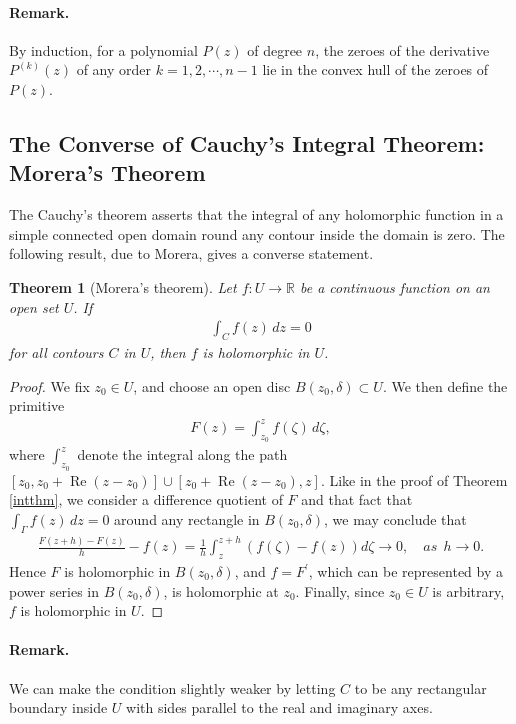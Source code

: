 \documentclass{article}
\numberwithin{equation}{section}
\newcommand{\bbR}{\mathbb{R}}
\DeclareMathOperator{\re}{Re}
\theoremstyle{plain}
\newtheorem{theorem}{Theorem}[section]
\theoremstyle{definition}
\begin{document}
\paragraph{Remark.} By induction, for a polynomial $P(z)$ of degree $n$, the zeroes of the derivative $P^{(k)}(z)$ of any order $k=1,2,\cdots,n-1$ lie in the convex hull of the zeroes of $P(z)$.

\subsection{The Converse of Cauchy's Integral Theorem: Morera's Theorem}
The Cauchy's theorem asserts that the integral of any holomorphic function in a simple connected open domain round any contour inside the domain is zero. The following result, due to Morera, gives a converse statement.
\begin{theorem}[Morera's theorem]\label{morera}
Let $f:U\to\bbR$ be a continuous function on an open set $U$. If
\begin{align*}
	\int_C f(z)\,dz=0
\end{align*}
for all contours $C$ in $U$, then $f$ is holomorphic in $U$.
\end{theorem}
\begin{proof}
We fix $z_0\in U$, and choose an open disc $B(z_0,\delta)\subset U$. We then define the primitive
\begin{align*}
	F(z)=\int_{z_0}^z f(\zeta)\,d\zeta,
\end{align*}
where $\int_{z_0}^z$ denote the integral along the path $[z_0,z_0+\re(z-z_0)]\cup[z_0+\re(z-z_0),z]$. Like in the proof of Theorem \ref{intthm}, we consider a difference quotient of $F$ and that fact that $\int_\Gamma f(z)\,dz=0$ around any rectangle in $B(z_0,\delta)$, we may conclude that
\begin{align*}
	\frac{F(z+h)-F(z)}{h}-f(z)=\frac{1}{h}\int_{z}^{z+h}(f(\zeta)-f(z))d\zeta\to 0,\quad as\ \ h\to 0.
\end{align*}
Hence $F$ is holomorphic in $B(z_0,\delta)$, and $f=F^\prime$, which can be represented by a power series in $B(z_0,\delta)$, is holomorphic at $z_0$. Finally, since $z_0\in U$ is arbitrary, $f$ is holomorphic in $U$.
\end{proof}
\paragraph{Remark.} We can make the condition slightly weaker by letting $C$ to be any rectangular boundary inside $U$ with
sides parallel to the real and imaginary axes.
\end{document}

